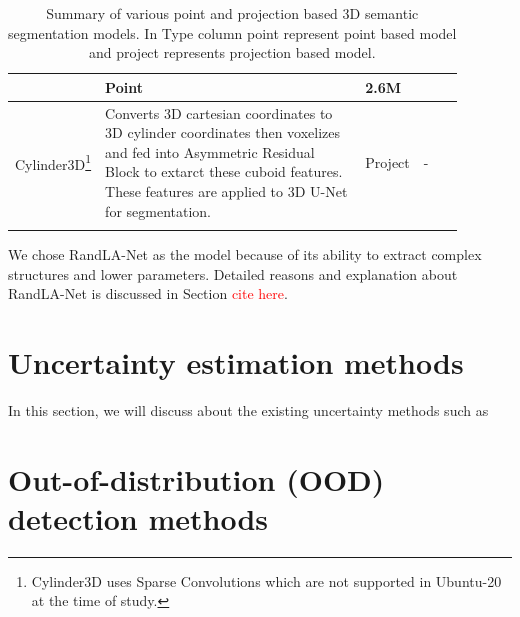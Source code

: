 \begin{longtable}{|p{0.15\linewidth} | p{0.59\linewidth}| p{0.06\linewidth} |p{0.09\linewidth}|}
        & Point & 2.6M \\
        \hline
        Cylinder3D\cite{zhu2020cylindrical}\footnote{Cylinder3D uses Sparse Convolutions which are not supported in Ubuntu-20 at the time of study.} &
        Converts 3D cartesian coordinates to 3D cylinder coordinates then voxelizes and fed into Asymmetric Residual Block to extarct these cuboid features.
        These features are applied to 3D U-Net for segmentation.
        & Project & - \\
        \hline
        \caption{Summary of various point and projection based 3D semantic segmentation models. In Type column point represent point based model and project represents projection based model.}
        \label{tab:model_relatedwork}
\end{longtable}

    We chose RandLA-Net as the model because of its ability to extract complex structures and lower parameters.
    Detailed reasons and explanation about RandLA-Net is discussed in Section \textcolor{red}{cite here}.

    \section{Uncertainty estimation methods}
    In this section, we will discuss about the existing uncertainty methods such as
    \section{Out-of-distribution (OOD) detection methods}

